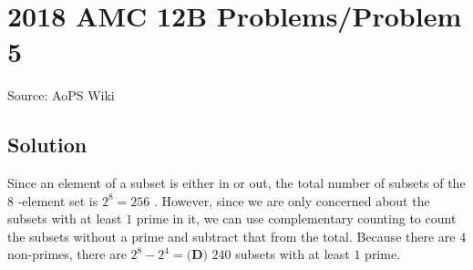 \documentclass[12pt]{article}
\begin{document}
\section*{{2018 AMC 12B Problems/Problem 5}}
Source: AoPS Wiki

\subsection*{Solution}
Since an element of a subset is either in or out, the total number of subsets of the $8$ -element set is $2^8 = 256$ . However, since we are only concerned about the subsets with at least $1$ prime in it, we can use complementary counting to count the subsets without a prime and subtract that from the total. Because there are $4$ non-primes, there are $2^8 -2^4 = \boxed{\textbf{(D) } 240}$ subsets with at least $1$ prime.
\end{document}

